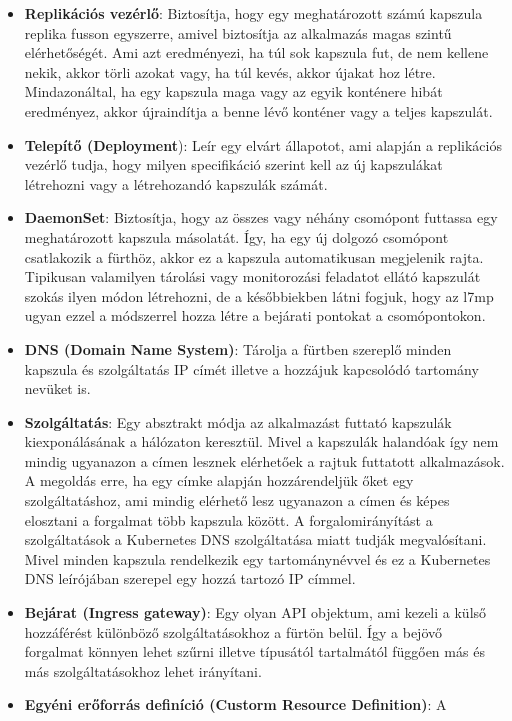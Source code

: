 \begin{itemize}
	\item \textbf{Replikációs vezérlő}: Biztosítja, hogy egy meghatározott számú 
	kapszula replika fusson egyszerre, amivel biztosítja az alkalmazás magas szintű
	elérhetőségét. Ami azt eredményezi, ha túl sok kapszula fut, de nem kellene nekik,
	akkor törli azokat vagy, ha túl kevés, akkor újakat hoz létre. Mindazonáltal, 
	ha egy kapszula maga vagy az egyik konténere hibát eredményez, akkor újraindítja
	a benne lévő konténer vagy a teljes kapszulát. 
	\item \textbf{Telepítő (Deployment}): Leír egy elvárt állapotot, ami alapján a
	replikációs vezérlő tudja, hogy milyen specifikáció szerint kell az új kapszulákat
	létrehozni vagy a létrehozandó kapszulák számát. 
	\item \textbf{DaemonSet}: Biztosítja, hogy az összes vagy néhány csomópont 
	futtassa egy meghatározott kapszula másolatát. Így, ha egy új dolgozó csomópont 
	csatlakozik a fürthöz, akkor ez a kapszula automatikusan megjelenik rajta. Tipikusan
	valamilyen tárolási vagy monitorozási feladatot ellátó kapszulát szokás ilyen
	módon létrehozni, de a későbbiekben látni fogjuk, hogy az l7mp ugyan ezzel a 
	módszerrel hozza létre a bejárati pontokat a csomópontokon.
	\item \textbf{DNS (Domain Name System)}: Tárolja a fürtben szereplő minden kapszula 
	és szolgáltatás IP címét illetve a hozzájuk kapcsolódó tartomány nevüket is.  
	\item \textbf{Szolgáltatás}: Egy absztrakt módja az alkalmazást futtató kapszulák
	kiexponálásának a hálózaton keresztül. Mivel a kapszulák halandóak így nem mindig
	ugyanazon a címen lesznek elérhetőek a rajtuk futtatott alkalmazások. A megoldás
	erre, ha egy címke alapján hozzárendeljük őket egy szolgáltatáshoz, ami mindig 
	elérhető lesz ugyanazon a címen és képes elosztani a forgalmat több kapszula között.
	A forgalomirányítást a szolgáltatások a Kubernetes DNS szolgáltatása miatt tudják 
	megvalósítani. Mivel minden kapszula rendelkezik egy tartománynévvel és ez a Kubernetes
	DNS leírójában szerepel egy hozzá tartozó IP címmel.
	\item \textbf{Bejárat (Ingress gateway)}: Egy olyan API objektum, ami kezeli a 
	külső hozzáférést különböző szolgáltatásokhoz a fürtön belül. Így a bejövő forgalmat
	könnyen lehet szűrni illetve típusától tartalmától függően más és más szolgáltatásokhoz
	lehet irányítani. 
	\item \textbf{Egyéni erőforrás definíció (Custorm Resource Definition)}: A 

\end{itemize}

